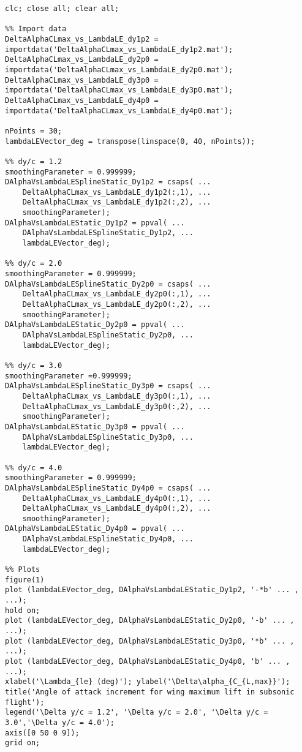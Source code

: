 \bigskip
\lstset{language=Matlab}
\begin{lstlisting}[caption={MATLAB script for creating the HDF Database}, captionpos=t, tabsize=2]
clc; close all; clear all;

%% Import data
DeltaAlphaCLmax_vs_LambdaLE_dy1p2 = importdata('DeltaAlphaCLmax_vs_LambdaLE_dy1p2.mat');
DeltaAlphaCLmax_vs_LambdaLE_dy2p0 = importdata('DeltaAlphaCLmax_vs_LambdaLE_dy2p0.mat');
DeltaAlphaCLmax_vs_LambdaLE_dy3p0 = importdata('DeltaAlphaCLmax_vs_LambdaLE_dy3p0.mat');
DeltaAlphaCLmax_vs_LambdaLE_dy4p0 = importdata('DeltaAlphaCLmax_vs_LambdaLE_dy4p0.mat');

nPoints = 30;
lambdaLEVector_deg = transpose(linspace(0, 40, nPoints));

%% dy/c = 1.2
smoothingParameter = 0.999999;
DAlphaVsLambdaLESplineStatic_Dy1p2 = csaps( ...
    DeltaAlphaCLmax_vs_LambdaLE_dy1p2(:,1), ...
    DeltaAlphaCLmax_vs_LambdaLE_dy1p2(:,2), ...
    smoothingParameter);
DAlphaVsLambdaLEStatic_Dy1p2 = ppval( ...
    DAlphaVsLambdaLESplineStatic_Dy1p2, ...
    lambdaLEVector_deg);

%% dy/c = 2.0
smoothingParameter = 0.999999; 
DAlphaVsLambdaLESplineStatic_Dy2p0 = csaps( ...
    DeltaAlphaCLmax_vs_LambdaLE_dy2p0(:,1), ...
    DeltaAlphaCLmax_vs_LambdaLE_dy2p0(:,2), ...
    smoothingParameter);
DAlphaVsLambdaLEStatic_Dy2p0 = ppval( ...
    DAlphaVsLambdaLESplineStatic_Dy2p0, ...
    lambdaLEVector_deg);

%% dy/c = 3.0
smoothingParameter =0.999999;
DAlphaVsLambdaLESplineStatic_Dy3p0 = csaps( ...
    DeltaAlphaCLmax_vs_LambdaLE_dy3p0(:,1), ...
    DeltaAlphaCLmax_vs_LambdaLE_dy3p0(:,2), ...
    smoothingParameter);
DAlphaVsLambdaLEStatic_Dy3p0 = ppval( ...
    DAlphaVsLambdaLESplineStatic_Dy3p0, ...
    lambdaLEVector_deg);

%% dy/c = 4.0
smoothingParameter = 0.999999; 
DAlphaVsLambdaLESplineStatic_Dy4p0 = csaps( ...
    DeltaAlphaCLmax_vs_LambdaLE_dy4p0(:,1), ...
    DeltaAlphaCLmax_vs_LambdaLE_dy4p0(:,2), ...
    smoothingParameter);
DAlphaVsLambdaLEStatic_Dy4p0 = ppval( ...
    DAlphaVsLambdaLESplineStatic_Dy4p0, ...
    lambdaLEVector_deg);

%% Plots
figure(1)
plot (lambdaLEVector_deg, DAlphaVsLambdaLEStatic_Dy1p2, '-*b' ... , ...);
hold on;
plot (lambdaLEVector_deg, DAlphaVsLambdaLEStatic_Dy2p0, '-b' ... , ...);
plot (lambdaLEVector_deg, DAlphaVsLambdaLEStatic_Dy3p0, '*b' ... , ...);
plot (lambdaLEVector_deg, DAlphaVsLambdaLEStatic_Dy4p0, 'b' ... , ...);
xlabel('\Lambda_{le} (deg)'); ylabel('\Delta\alpha_{C_{L,max}}');
title('Angle of attack increment for wing maximum lift in subsonic flight');
legend('\Delta y/c = 1.2', '\Delta y/c = 2.0', '\Delta y/c = 3.0','\Delta y/c = 4.0');
axis([0 50 0 9]);
grid on;
 

\end{lstlisting}
